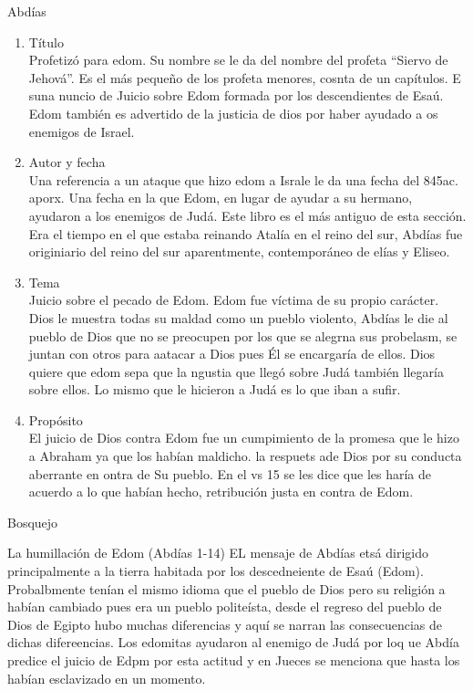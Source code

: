 \documentclass[12pt]{article}
\begin{document}
\begin{section}{Abdías}
	\begin{enumerate}
		\item Título\\
			Profetizó para edom. Su nombre se le da del nombre del profeta ``Siervo de Jehová''. Es el más pequeño de los profeta menores, cosnta de un capítulos. E suna nuncio de Juicio sobre Edom formada por los descendientes de Esaú. Edom también es advertido de la justicia de dios por haber ayudado a os enemigos de Israel.
		\item Autor y fecha\\
			Una referencia a un ataque que hizo edom a Israle le da una fecha del 845ac. aporx. Una fecha en la que Edom, en lugar de ayudar a su hermano, ayudaron a los enemigos de Judá. Este libro es el más antiguo de esta sección. Era el tiempo en el que estaba reinando Atalía en el reino del sur, Abdías fue originiario del reino del sur aparentmente, contemporáneo de elías y Eliseo.
		\item Tema\\
			Juicio sobre el pecado de Edom. Edom fue víctima de su propio carácter. Dios le muestra todas su maldad como un pueblo violento, Abdías le die al pueblo de Dios que no se preocupen por los que se alegrna sus probelasm, se juntan con otros para aatacar a Dios pues Él se encargaría de ellos. Dios quiere que edom sepa que la ngustia que llegó sobre Judá también llegaría sobre ellos. Lo mismo que le hicieron a Judá es lo que iban a sufir.
		\item Propósito\\
			El juicio de Dios contra Edom fue un cumpimiento de la promesa que le hizo a Abraham ya que los habían maldicho. la respuets ade Dios por su conducta aberrante en ontra de Su pueblo. En el vs 15 se les dice que les haría de acuerdo a lo que habían hecho, retribución justa en contra de Edom. 
	\end{enumerate}
	\begin{subsection}{Bosquejo}
		\begin{subsubsection}{La humillación de Edom (Abdías 1-14)}
			EL mensaje de Abdías etsá dirigido principalmente a la tierra habitada por los descedneiente de Esaú (Edom). Probalbmente tenían el mismo idioma que el pueblo de Dios pero su religión a habían cambiado pues era un pueblo politeísta, desde el regreso del pueblo de Dios de Egipto hubo muchas diferencias y aquí se narran las consecuencias de dichas difereencias. Los edomitas ayudaron al enemigo de Judá por loq ue Abdía predice el juicio de Edpm por esta actitud y en Jueces se menciona que hasta los habían esclavizado en un momento.\\

\end{subsubsection}
\end{subsection}
\end{section}
\end{document}
